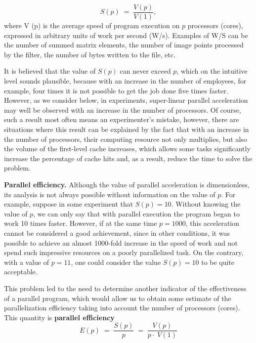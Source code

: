 {	\begin{equation}
		\label{parallelAcceleration:equation}
		S(p)\;=\;\frac{V(p)}{V(1)},
	\end{equation}
	where V (p) is the average speed of program execution on $p$ processors (cores), expressed in arbitrary units of work per second (W/s). Examples of W/S can be the number of summed matrix elements, the number of image points processed by the filter, the number of bytes written to the file, etc.
	\par It is believed that the value of $ S(p)$ can never exceed $p$, which on the intuitive level sounds plausible, because with an increase in the number of employees, for example, four times it is not possible to get the job done five times faster. However, as we consider below, in experiments, super-linear parallel acceleration may well be observed with an increase in the number of processors. Of course, such a result most often means an experimenter's mistake, however, there are situations where this result can be explained by the fact that with an increase in the number of processors, their computing resource not only multiplies, but also the volume of the first-level cache increases, which allows some tasks significantly increase the percentage of cache hits and, as a result, reduce the time to solve the problem.
	\par\textbf{Parallel efficiency.} Although the value of parallel acceleration is dimensionless, its analysis is not always possible without information on the value of $p$. For example, suppose in some experiment that $S(p) = 10 $. Without knowing the value of $p$, we can only say that with parallel execution the program began to work 10 times faster. However, if at the same time $ p = 1000 $, this acceleration cannot be considered a good achievement, since in other conditions, it was possible to achieve an almost 1000-fold increase in the speed of work and not spend such impressive resources on a poorly parallelized task. On the contrary, with a value of $ p = 11 $, one could consider the value $ S (p) = 10 $ to be quite acceptable.
	\par This problem led to the need to determine another indicator of the effectiveness of a parallel program, which would allow us to obtain some estimate of the parallelization efficiency taking into account the number of processors (cores). This quantity is
	 \textbf{parallel efficiency}
	\begin{equation}
		\label{parallelEffect:equation}
		E(p)\;=\;\frac{S(p)}p\;=\;\frac{V(p)}{p\cdot\;V(1)}

\end{equation}}
